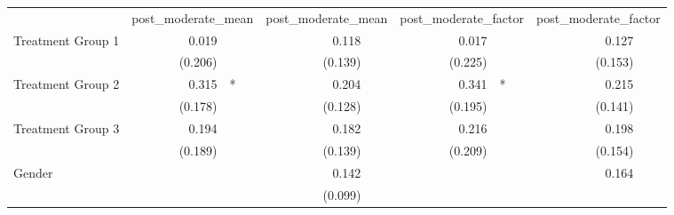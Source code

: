 \documentclass{article}
\begin{document}
\begin{table}[!h]
\centering
\begin{tabular}{lllllllll}
\cline{1-9}
\multicolumn{1}{r}{} &
  \multicolumn{2}{c}{post\_moderate\_mean} &
  \multicolumn{2}{c}{post\_moderate\_mean} &
  \multicolumn{2}{c}{post\_moderate\_factor} &
  \multicolumn{2}{c}{post\_moderate\_factor} \\
\cline{1-9}
\multicolumn{1}{l}{Treatment Group 1} &
  \multicolumn{1}{r}{0.019} &
  \multicolumn{1}{l}{} &
  \multicolumn{1}{r}{0.118} &
  \multicolumn{1}{l}{} &
  \multicolumn{1}{r}{0.017} &
  \multicolumn{1}{l}{} &
  \multicolumn{1}{r}{0.127} &
  \multicolumn{1}{l}{} \\
\multicolumn{1}{l}{} &
  \multicolumn{1}{r}{(0.206)} &
  \multicolumn{1}{l}{} &
  \multicolumn{1}{r}{(0.139)} &
  \multicolumn{1}{l}{} &
  \multicolumn{1}{r}{(0.225)} &
  \multicolumn{1}{l}{} &
  \multicolumn{1}{r}{(0.153)} &
  \multicolumn{1}{l}{} \\
\multicolumn{1}{l}{Treatment Group 2} &
  \multicolumn{1}{r}{0.315} &
  \multicolumn{1}{l}{*} &
  \multicolumn{1}{r}{0.204} &
  \multicolumn{1}{l}{} &
  \multicolumn{1}{r}{0.341} &
  \multicolumn{1}{l}{*} &
  \multicolumn{1}{r}{0.215} &
  \multicolumn{1}{l}{} \\
\multicolumn{1}{l}{} &
  \multicolumn{1}{r}{(0.178)} &
  \multicolumn{1}{l}{} &
  \multicolumn{1}{r}{(0.128)} &
  \multicolumn{1}{l}{} &
  \multicolumn{1}{r}{(0.195)} &
  \multicolumn{1}{l}{} &
  \multicolumn{1}{r}{(0.141)} &
  \multicolumn{1}{l}{} \\
\multicolumn{1}{l}{Treatment Group 3} &
  \multicolumn{1}{r}{0.194} &
  \multicolumn{1}{l}{} &
  \multicolumn{1}{r}{0.182} &
  \multicolumn{1}{l}{} &
  \multicolumn{1}{r}{0.216} &
  \multicolumn{1}{l}{} &
  \multicolumn{1}{r}{0.198} &
  \multicolumn{1}{l}{} \\
\multicolumn{1}{l}{} &
  \multicolumn{1}{r}{(0.189)} &
  \multicolumn{1}{l}{} &
  \multicolumn{1}{r}{(0.139)} &
  \multicolumn{1}{l}{} &
  \multicolumn{1}{r}{(0.209)} &
  \multicolumn{1}{l}{} &
  \multicolumn{1}{r}{(0.154)} &
  \multicolumn{1}{l}{} \\
\multicolumn{1}{l}{Gender} &
  \multicolumn{1}{r}{} &
  \multicolumn{1}{l}{} &
  \multicolumn{1}{r}{0.142} &
  \multicolumn{1}{l}{} &
  \multicolumn{1}{r}{} &
  \multicolumn{1}{l}{} &
  \multicolumn{1}{r}{0.164} &
  \multicolumn{1}{l}{} \\
\multicolumn{1}{l}{} &
  \multicolumn{1}{r}{} &
  \multicolumn{1}{l}{} &
  \multicolumn{1}{r}{(0.099)} &
  \multicolumn{1}{l}{} &
  \multicolumn{1}{r}{} &

\end{tabular}
\end{table}
\end{document}
